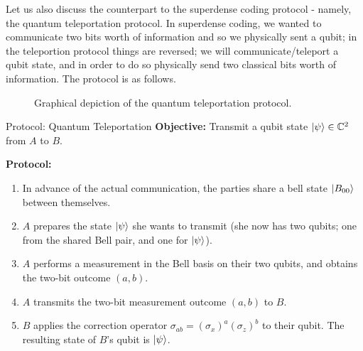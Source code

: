 Let us also discuss the counterpart to the superdense coding protocol - namely, the quantum teleportation protocol. In superdense coding, we wanted to communicate two bits worth of information and so we physically sent a qubit; in the teleportion protocol things are reversed; we will communicate/teleport a qubit state, and in order to do so physically send two classical bits worth of information. The protocol is as follows.

\begin{figure}[htbp]
    \centering
    \caption{Graphical depiction of the quantum teleportation protocol.}
    \label{fig-teleportation}
\end{figure}

\begin{blankbox}{Protocol: Quantum Teleportation}
    \textbf{Objective:} Transmit a qubit state $\lvert \psi \rangle \in \mathbb{C}^2$ from $A$ to $B$.

    \noindent
    \textbf{Protocol:}
    \begin{enumerate}
        \item In advance of the actual communication, the parties share a bell state $\lvert B_{00} \rangle$ between themselves.
        \item $A$ prepares the state $\lvert \psi \rangle$ she wants to transmit (she now has two qubits; one from the shared Bell pair, and one for $\lvert \psi \rangle$).
        \item $A$ performs a measurement in the Bell basis on their two qubits, and obtains the two-bit outcome $(a, b)$. 
        \item $A$ transmits the two-bit measurement outcome $(a, b)$ to $B$.
        \item $B$ applies the correction operator $\sigma_{ab} = (\sigma_x)^a(\sigma_z)^b$ to their qubit. The resulting state of $B$'s qubit is $\lvert \psi \rangle$.
    \end{enumerate}
\end{blankbox}

